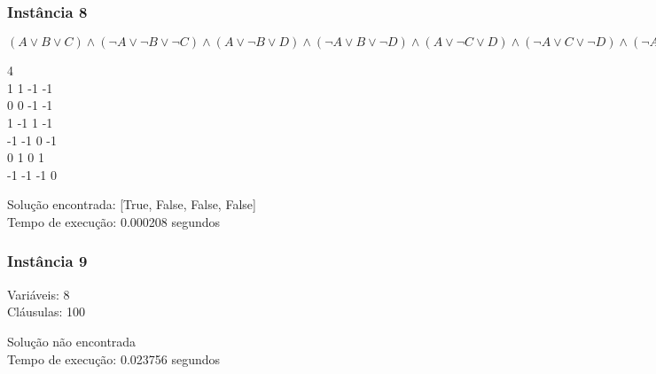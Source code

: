 \documentclass[12pt]{article}
\begin{document}
    \subsubsection{Instância 8}
        \((A \lor B \lor C) \land (\neg A \lor \neg B \lor \neg C) \land (A \lor \neg B \lor D) \land (\neg A \lor B \lor \neg D) \land (A \lor \neg C \lor D) \land (\neg A \lor C \lor \neg D) \land (\neg A \lor \neg B \lor C \lor D) \land (A \lor B \lor \neg C \lor \neg D)\)
        \begin{tcolorbox}[title=Entrada da instância 8, width=\linewidth, fontupper=\ttfamily,  halign=flush left]
            4 \\
            1 1 -1 -1 \\
            0 0 -1 -1 \\
            1 -1 1 -1 \\
            -1 -1 0 -1 \\
            0 1 0 1 \\
            -1 -1 -1 0 \\
        \end{tcolorbox}
        \begin{tcolorbox}[title=Saída da instância 8, width=\linewidth, fontupper=\ttfamily, halign=flush left]
            Solução encontrada: [True, False, False, False] \\
            Tempo de execução: 0.000208 segundos
        \end{tcolorbox}
    \subsubsection{Instância 9}
        \begin{tcolorbox}[title=Entrada da instância 9, width=\linewidth, fontupper=\ttfamily,  halign=flush left]
            Variáveis: 8 \\
            Cláusulas: 100
        \end{tcolorbox}
        \begin{tcolorbox}[title=Saída da instância 9, width=\linewidth, fontupper=\ttfamily, halign=flush left]
            Solução não encontrada \\
            Tempo de execução: 0.023756 segundos
        \end{tcolorbox}
\end{document}
